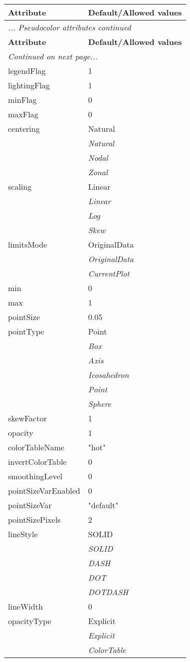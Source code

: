 \documentclass[10pt,a4paper]{report}
\begin{document}
\begin{longtable}{ll}
{\bf Attribute} & {\bf Default/Allowed values} \\
\hline \hline
\endfirsthead
\multicolumn{2}{l}{{\it ... Pseudocolor attributes continued}} \\
{\bf Attribute} & {\bf Default/Allowed values} \\
\hline \hline
\endhead
\hline
\multicolumn{2}{l}{{\it Continued on next page...}} \\
\endfoot
\hline
\endlastfoot

legendFlag  &  1 \\
lightingFlag  &  1 \\
minFlag  &  0 \\
maxFlag  &  0 \\
centering  &  Natural   \\
 & {\it  Natural} \\
 & {\it  Nodal} \\
 & {\it  Zonal} \\
scaling  &  Linear   \\
 & {\it  Linear} \\
 & {\it  Log} \\
 & {\it  Skew} \\
limitsMode  &  OriginalData   \\
 & {\it  OriginalData} \\
 & {\it  CurrentPlot} \\
min  &  0 \\
max  &  1 \\
pointSize  &  0.05 \\
pointType  &  Point   \\
 & {\it  Box} \\
 & {\it  Axis} \\
 & {\it  Icosahedron} \\
 & {\it  Point} \\
 & {\it  Sphere} \\
skewFactor  &  1 \\
opacity  &  1 \\
colorTableName  &  "hot" \\
invertColorTable  &  0 \\
smoothingLevel  &  0 \\
pointSizeVarEnabled  &  0 \\
pointSizeVar  &  "default" \\
pointSizePixels  &  2 \\
lineStyle  &  SOLID   \\
 & {\it  SOLID} \\
 & {\it  DASH} \\
 & {\it  DOT} \\
 & {\it  DOTDASH} \\
lineWidth  &  0 \\
opacityType  &  Explicit   \\
 & {\it  Explicit} \\
 & {\it  ColorTable} \\
\end{longtable}
\end{document}
